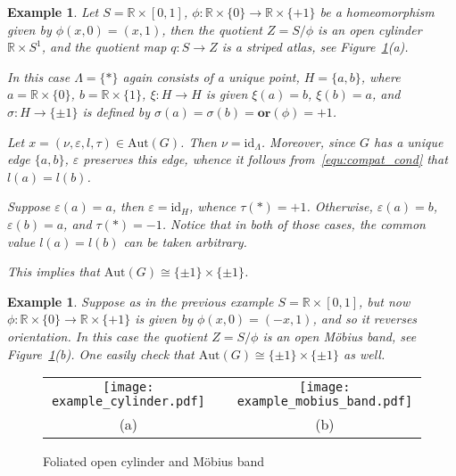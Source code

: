\documentclass[12pt, reqno]{amsart}
\newcommand{\examplename}{Example}%
\newtheorem{example}[subsection]{\protect\examplename}
\newcommand{\bR}{\mathbb{R}}
\newcommand{\strip}{S}
\newcommand{\stripSurf}{Z}
\newcommand{\StInd}{\Lambda}
\newcommand{\id}{\mathrm{id}}
\newcommand{\qmap}{q}
\newcommand\Gr{G}
\newcommand\AutG{\mathrm{Aut}(\Gr)}
\newcommand\ori{\mathbf{or}}
\newcommand\lori{l}
\newcommand\tori{\tau}
\newcommand\edge[2]{\{#1,#2\}}
\newcommand\eiso{\varepsilon}
\newcommand\viso{\nu}
\newcommand\mZZ{\{\pm1\}}
\begin{document}
\begin{example}\label{exmp:open_cylinder}
Let $\strip=\bR\times[0,1]$, $\phi:\bR\times\{0\}\to\bR\times\{+1\}$ be a homeomorphism given by $\phi(x,0) = (x,1)$, then the quotient $\stripSurf = \strip / \phi$ is an \textit{open cylinder} $\bR\times S^1$, and the quotient map $\qmap:\strip \to\stripSurf$ is a striped atlas, see Figure~\ref{fig:cylindes_mobius_band}(a).

In this case $\StInd=\{*\}$ again consists of a unique point, $H = \{a,b\}$, where $a=\bR\times\{0\}$, $b=\bR\times\{1\}$, $\xi:H\to H$ is given $\xi(a)=b$, $\xi(b)=a$, and $\sigma:H\to\mZZ$ is defined by $\sigma(a)=\sigma(b)=\ori(\phi)=+1$.

Let $x=(\viso, \eiso, \lori, \tori) \in \AutG$.
Then $\viso = \id_{\StInd}$.
Moreover, since $\Gr$ has a unique edge $\edge{a}{b}$, $\eiso$ preserves this edge, whence it follows from~\eqref{equ:compat_cond} that $\lori(a) =\lori(b)$.

Suppose $\eiso(a)=a$, then $\eiso=\id_{H}$, whence $\tori(*)=+1$.
Otherwise, $\eiso(a)=b$, $\eiso(b)=a$, and $\tori(*)=-1$.
Notice that in both of those cases, the common value $\lori(a) =\lori(b)$ can be taken arbitrary.

This implies that $\AutG \cong \mZZ \times \mZZ$.
\end{example}

\begin{example}\label{exmp:open_Mobius_band}
Suppose as in the previous example $\strip=\bR\times[0,1]$, but now $\phi:\bR\times\{0\}\to\bR\times\{+1\}$ is given by $\phi(x,0) = (-x,1)$, and so it reverses orientation.
In this case the quotient $\stripSurf = \strip / \phi$ is an \textit{open M\"obius band}, see Figure~\ref{fig:cylindes_mobius_band}(b).
One easily check that $\AutG \cong \mZZ \times \mZZ$ as well.
\end{example}


\begin{figure}[ht]
\begin{tabular}{ccc}
\texttt{[image: example\_cylinder.pdf]} & \qquad\qquad\qquad & 
\texttt{[image: example\_mobius\_band.pdf]}  \\
(a) & &  (b) 
\end{tabular}
\caption{Foliated open cylinder and M\"obius band}\label{fig:cylindes_mobius_band}
\end{figure}
\end{document}
